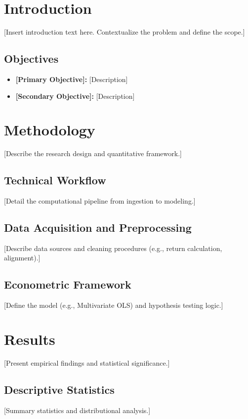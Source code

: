 \newpage
\tableofcontents
\newpage

\section{Introduction}
{} [Insert introduction text here. Contextualize the problem and define the scope.]

\subsection{Objectives}
\begin{itemize}
    \item \textbf{[Primary Objective]:} [Description]
    \item \textbf{[Secondary Objective]:} [Description]
\end{itemize}

\section{Methodology}
{} [Describe the research design and quantitative framework.]

\subsection{Technical Workflow}
{} [Detail the computational pipeline from ingestion to modeling.]

\subsection{Data Acquisition and Preprocessing}
{} [Describe data sources and cleaning procedures (e.g., return calculation, alignment).]

\subsection{Econometric Framework}
{} [Define the model (e.g., Multivariate OLS) and hypothesis testing logic.]

\section{Results}
{} [Present empirical findings and statistical significance.]

\subsection{Descriptive Statistics}
{} [Summary statistics and distributional analysis.]

